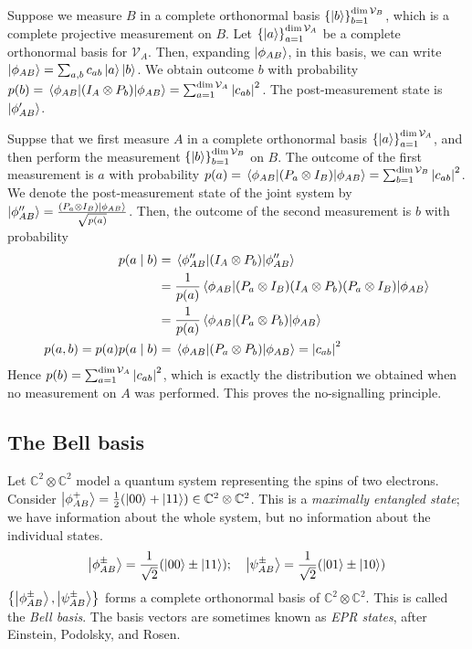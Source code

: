 Suppose we measure \( B \) in a complete orthonormal basis \( \qty{\ket{b}}_{b=1}^{\dim \mathcal V_B} \), which is a complete projective measurement on \( B \).
Let \( \qty{\ket{a}}_{a=1}^{\dim \mathcal V_A} \) be a complete orthonormal basis for \( \mathcal V_A \).
Then, expanding \( \ket{\phi_{AB}} \), in this basis, we can write \( \ket{\phi_{AB}} = \sum_{a,b} c_{ab} \ket{a} \ket{b} \).
We obtain outcome \( b \) with probability \( p(b) = \ev{\qty(I_A \otimes P_b)}{\phi_{AB}} = \sum_{a=1}^{\dim \mathcal V_A} \abs{c_{ab}}^2 \).
The post-measurement state is \( \ket{\phi_{AB}'} \).

Suppse that we first measure \( A \) in a complete orthonormal basis \( \qty{\ket{a}}_{a=1}^{\dim \mathcal V_A} \), and then perform the measurement \( \qty{\ket{b}}_{b=1}^{\dim \mathcal V_B} \) on \( B \).
The outcome of the first measurement is \( a \) with probability \( p(a) = \ev{\qty(P_a \otimes I_B)}{\phi_{AB}} = \sum_{b=1}^{\dim \mathcal V_B} \abs{c_{ab}}^2 \).
We denote the post-measurement state of the joint system by \( \ket{\phi_{AB}''}= \frac{(P_a \otimes I_B) \ket{\phi_{AB}}}{\sqrt{p(a)}} \).
Then, the outcome of the second measurement is \( b \) with probability
\begin{align*}
    p(a \mid b) &= \ev{\qty(I_A \otimes P_b)}{\phi_{AB}''} \\
    &= \frac{1}{p(a)} \ev{(P_a \otimes I_B) (I_A \otimes P_b) (P_a \otimes I_B)}{\phi_{AB}} \\
    &= \frac{1}{p(a)} \ev{(P_a \otimes P_b)}{\phi_{AB}} \\
    p(a,b) = p(a) p(a \mid b) &= \ev{(P_a \otimes P_b)}{\phi_{AB}} = \abs{c_{ab}}^2
\end{align*}
Hence \( p(b) = \sum_{a=1}^{\dim \mathcal V_A} \abs{c_{ab}}^2 \), which is exactly the distribution we obtained when no measurement on \( A \) was performed.
This proves the no-signalling principle.

\subsection{The Bell basis}
Let \( \mathbb C^2 \otimes \mathbb C^2 \) model a quantum system representing the spins of two electrons.
Consider \( \ket{\phi_{AB}^+} = \frac{1}{2}\qty(\ket{00} + \ket{11}) \in \mathbb C^2 \otimes \mathbb C^2 \).
This is a \emph{maximally entangled state}; we have information about the whole system, but no information about the individual states.
\[ \ket{\phi_{AB}^\pm} = \frac{1}{\sqrt{2}} \qty(\ket{00} \pm \ket{11});\quad \ket{\psi_{AB}^\pm} = \frac{1}{\sqrt{2}} \qty(\ket{01} \pm \ket{10}) \]
\( \qty{\ket{\phi_{AB}^\pm}, \ket{\psi_{AB}^\pm}} \) forms a complete orthonormal basis of \( \mathbb C^2 \otimes \mathbb C^2 \).
This is called the \emph{Bell basis}.
The basis vectors are sometimes known as \emph{EPR states}, after Einstein, Podolsky, and Rosen.

